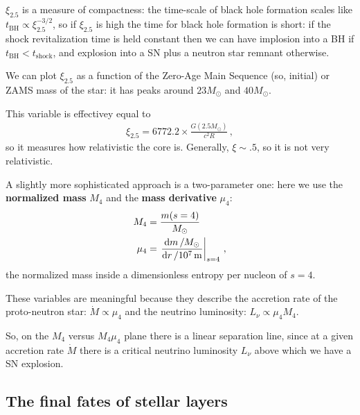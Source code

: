\documentclass[main.tex]{subfiles}
\begin{document}
\(\xi_{2.5} \) is a measure of compactness: the time-scale of black hole formation scales like \(t _{\text{BH}} \propto \xi_{2.5}^{-3/2}\), so if \(\xi_{2.5}\) is high the time for black hole formation is short: if the shock revitalization time is held constant then we can have implosion into a BH if \(t _{\text{BH}} < t _{\text{shock}}\), and explosion into a SN plus a neutron star remnant otherwise.


We can plot \(\xi_{2.5}\) as a function of the Zero-Age Main Sequence (so, initial) or ZAMS mass of the star: it has peaks around \(23 M_{\odot}\) and \(40 M_{\odot}\).

\begin{bluebox}
This variable is effectivey equal to 
%
\begin{align}
\xi_{2.5} = 6772.2 \times \frac{G (2.5 M_{\odot})}{c^2 R}
\,,
\end{align}
%
so it measures how relativistic the core is. Generally, \(\xi \sim \num{.5}\), so it is not very relativistic.
\end{bluebox}

A slightly more sophisticated approach is a two-parameter one: here we use the \textbf{normalized mass} \(M_{4}\) and the \textbf{mass derivative} \(\mu_{4}\):
%
\begin{align}
M_4 &= \frac{m(s=4)}{M_{\odot}} \\
\mu_{4} &= \eval{\frac{ \dd{m} / M_{\odot}}{ \dd{r} / \SI{e7}{m}}}_{s=4}
\,,
\end{align}
%
the normalized mass inside a dimensionless entropy per nucleon of \(s=4\).  

These variables are meaningful because they describe the accretion rate of the proto-neutron star: \(\dot{M} \propto \mu_4 \) and the neutrino luminosity: \(L_{\nu } \propto \mu_4 M_4 \).

So, on the \(M_4 \) versus \(M_4 \mu_4 \) plane there is a linear separation line, since at a given accretion rate \(\dot{M}\) there is a critical neutrino luminosity \(L_{\nu }\) above which we have a SN explosion.

\subsection{The final fates of stellar layers}
\end{document}
